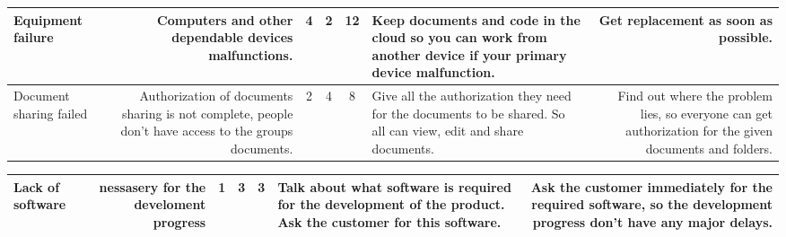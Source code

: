 \begin{center}
\begin{tabulary}{\textwidth}{L | R | C | C | C | L | R}
\hline
Equipment failure & Computers and other dependable devices malfunctions. & 4 & 2 & 12 & Keep documents and code in the cloud so you can work from another device if your primary device malfunction. & Get replacement as soon as possible.\\ 
\hline
Document sharing failed & Authorization of documents sharing is not complete, people don't have access to the groups documents. & 2 & 4 & 8 & Give all the authorization they need for the documents to be shared. So all can view, edit and share documents. & Find out where the problem lies, so everyone can get authorization for the given documents and folders.\\ 
\hline
						\end{tabulary}
						\begin{tabulary}{\textwidth}{L | R | C | C | C | L | R} \toprule
Lack of software  & nessasery for the develoment progress & 1 & 3 & 3 & Talk about what software is required for the development of the product. Ask the customer for this software.   & Ask the customer immediately for the required software, so the development progress don't have any major delays. \\ 
\hline

						\end{tabulary}
					\end{center}